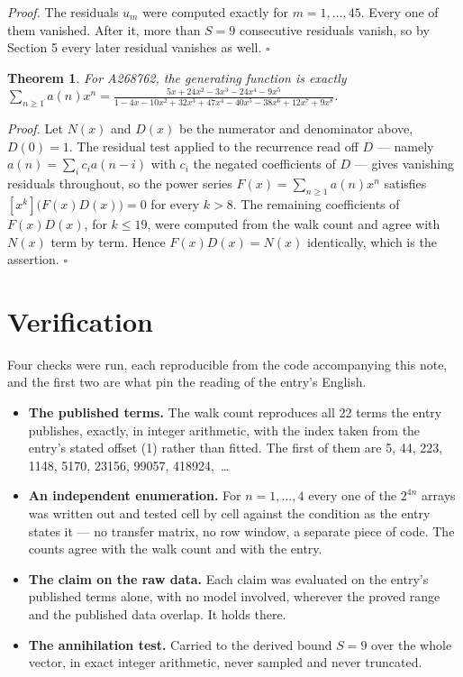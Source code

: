 \documentclass[11pt]{article}
\newtheorem{theorem}{Theorem}
\theoremstyle{definition}
\begin{document}
{\itshape Proof.} The residuals $u_m$ were computed exactly for $m = 1,\dots,45$. Every one of them vanished. After it, more than $S = 9$ consecutive residuals vanish, so by Section 5 every later residual vanishes as well. $\square$

\begin{theorem} For A268762, the generating function is exactly $\sum_{n\ge 1} a(n)x^n = \frac{5x + 24x^{2} - 3x^{3} - 24x^{4} - 9x^{5}}{1 - 4x - 10x^{2} + 32x^{3} + 47x^{4} - 40x^{5} - 38x^{6} + 12x^{7} + 9x^{8}}$.\end{theorem}

{\itshape Proof.} Let $N(x)$ and $D(x)$ be the numerator and denominator above, $D(0)=1$. The residual test applied to the recurrence read off $D$ --- namely $a(n) = \sum_i c_i a(n-i)$ with $c_i$ the negated coefficients of $D$ --- gives vanishing residuals throughout, so the power series $F(x)=\sum_{n\ge 1}a(n)x^n$ satisfies $[x^k]\bigl(F(x)D(x)\bigr) = 0$ for every $k > 8$. The remaining coefficients of $F(x)D(x)$, for $k \le 19$, were computed from the walk count and agree with $N(x)$ term by term. Hence $F(x)D(x) = N(x)$ identically, which is the assertion. $\square$

\section{Verification}

Four checks were run, each reproducible from the code accompanying this note, and the first two are what pin the reading of the entry's English.

\begin{itemize}

\item {\bfseries The published terms.} The walk count reproduces all 22 terms the entry publishes, exactly, in integer arithmetic, with the index taken from the entry's stated offset (1) rather than fitted. The first of them are 5, 44, 223, 1148, 5170, 23156, 99057, 418924,~\dots

\item {\bfseries An independent enumeration.} For $n = 1,\dots,4$ every one of the $2^{4n}$ arrays was written out and tested cell by cell against the condition as the entry states it --- no transfer matrix, no row window, a separate piece of code. The counts agree with the walk count and with the entry.

\item {\bfseries The claim on the raw data.} Each claim was evaluated on the entry's published terms alone, with no model involved, wherever the proved range and the published data overlap. It holds there.

\item {\bfseries The annihilation test.} Carried to the derived bound $S = 9$ over the whole vector, in exact integer arithmetic, never sampled and never truncated.

\end{itemize}
\end{document}

